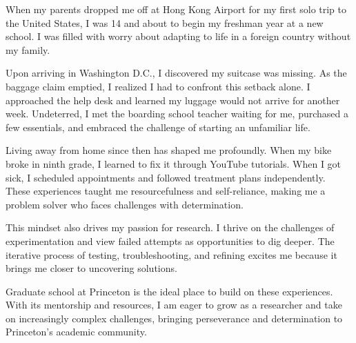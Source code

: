 \documentclass[11pt]{article}
\begin{document}
When my parents dropped me off at Hong Kong Airport for my first solo trip to the United States, I was 14 and about to begin my freshman year at a new school. I was filled with worry about adapting to life in a foreign country without my family.

Upon arriving in Washington D.C., I discovered my suitcase was missing. As the baggage claim emptied, I realized I had to confront this setback alone. I approached the help desk and learned my luggage would not arrive for another week. Undeterred, I met the boarding school teacher waiting for me, purchased a few essentials, and embraced the challenge of starting an unfamiliar life.

Living away from home since then has shaped me profoundly. When my bike broke in ninth grade, I learned to fix it through YouTube tutorials. When I got sick, I scheduled appointments and followed treatment plans independently. These experiences taught me resourcefulness and self-reliance, making me a problem solver who faces challenges with determination.

This mindset also drives my passion for research. I thrive on the challenges of experimentation and view failed attempts as opportunities to dig deeper. The iterative process of testing, troubleshooting, and refining excites me because it brings me closer to uncovering solutions.

Graduate school at Princeton is the ideal place to build on these experiences. With its mentorship and resources, I am eager to grow as a researcher and take on increasingly complex challenges, bringing perseverance and determination to Princeton’s academic community.
\end{document}
